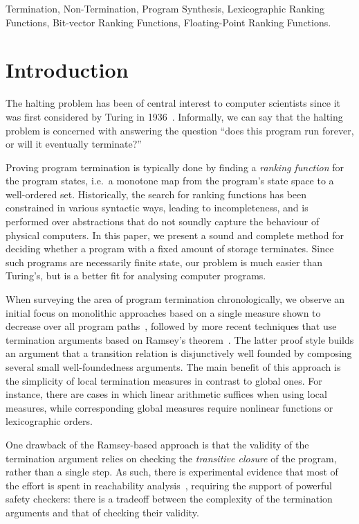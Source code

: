 \documentclass[preprint]{sigplanconf}
\theoremstyle{definition}
\begin{document}

\keywords
Termination, Non-Termination, Program Synthesis,
Lexicographic Ranking Functions, Bit-vector Ranking Functions, Floating-Point Ranking Functions.

\section{Introduction}\label{sec:intro}

The halting problem has been of central interest to computer scientists
since it was first considered by Turing in 1936~\cite{turing}.  Informally,
we can say that the halting problem is concerned with answering the question
``does this program run forever, or will it eventually terminate?''

Proving program termination is typically done by finding a \emph{ranking
function} for the program states, i.e.~a monotone map from the program's
state space to a well-ordered set.  Historically, the search for ranking
functions has been constrained in various syntactic ways, leading to
incompleteness, and is performed over abstractions that do not soundly
capture the behaviour of physical computers.  In this paper, we present a
sound and complete method for deciding whether a program with a fixed amount of
storage terminates.  Since such programs are necessarily finite state, our
problem is much easier than Turing's, but is a better fit for analysing computer
programs.

When surveying the area of program termination chronologically, we observe
an initial focus on monolithic approaches based on a single measure shown to
decrease over all program
paths~\cite{DBLP:conf/vmcai/P04,DBLP:conf/cav/BradleyMS05}, followed by more
recent techniques that use termination arguments based on Ramsey's
theorem~\cite{DBLP:conf/lpe/CodishG03,DBLP:conf/lics/PodelskiR04,DBLP:conf/pldi/CookPR06}.
The latter proof style builds an argument that a transition relation is disjunctively well founded
by composing several small well-foundedness arguments.
The main benefit of this approach is
the simplicity of local termination measures in contrast to global ones. 
For instance, there are cases in which linear arithmetic suffices when using
local measures, while corresponding global measures require nonlinear
functions or lexicographic orders.

One drawback of the Ramsey-based approach is that the validity of the
termination argument relies on checking the \emph{transitive closure} of the
program, rather than a single step.  As such, there is experimental evidence
that most of the effort is spent in reachability
analysis~\cite{DBLP:conf/pldi/CookPR06,DBLP:conf/cav/KroeningSTW10},
requiring the support of powerful safety checkers: there is a tradeoff
between the complexity of the termination arguments and that of checking
their validity.
\end{document}
